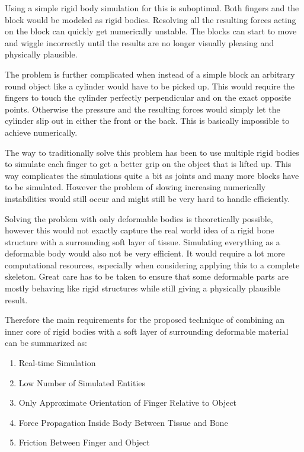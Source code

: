 Using a simple rigid body simulation for this is suboptimal. Both fingers and the block would be modeled as rigid bodies. Resolving all the resulting forces acting on the block can quickly get numerically unstable. The blocks can start to move and wiggle incorrectly until the results are no longer visually pleasing and physically plausible.

The problem is further complicated when instead of a simple block an arbitrary round object like a cylinder would have to be picked up. This would require the fingers to touch the cylinder perfectly perpendicular and on the exact opposite points. Otherwise the pressure and the resulting forces would simply let the cylinder slip out in either the front or the back. This is basically impossible to achieve numerically.

The way to traditionally solve this problem has been to use multiple rigid bodies to simulate  each finger to get a better grip on the object that is lifted up. This way complicates the simulations quite a bit as joints and many more blocks have to be simulated. However the problem of slowing increasing numerically instabilities would still occur and might still be very hard to handle efficiently.

Solving the problem with only deformable bodies is theoretically possible, however this would not exactly capture the real world idea of a rigid bone structure with a surrounding soft layer of tissue. Simulating everything as a deformable body would also not be very efficient. It would require a lot more computational resources, especially when considering applying this to a complete skeleton. Great care has to be taken to ensure that some deformable parts are mostly behaving like rigid structures while still giving a physically plausible result.

Therefore the main requirements for the proposed technique of combining an inner core of rigid bodies with a soft layer of surrounding deformable material can be summarized as:

\begin{enumerate}
\item Real-time Simulation
\item Low Number of Simulated Entities
\item Only Approximate Orientation of Finger Relative to Object
\item Force Propagation Inside Body Between Tissue and Bone
\item Friction Between Finger and Object
\end{enumerate}